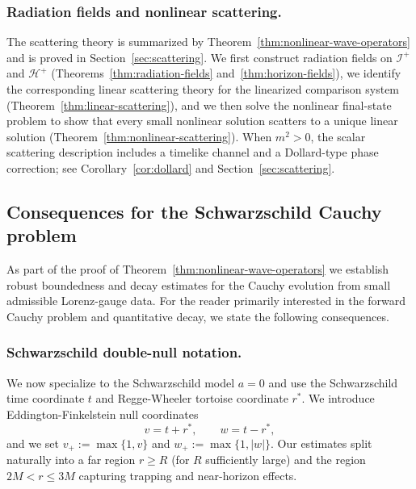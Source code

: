 \documentclass[11pt]{article}
\numberwithin{equation}{section}
\theoremstyle{plain}
\theoremstyle{definition}
\theoremstyle{remark}
\newcommand{\vplus}{v_{+}}
\newcommand{\wplus}{w_{+}}
\begin{document}
\subsubsection*{Radiation fields and nonlinear scattering.}
The scattering theory is summarized by Theorem~\ref{thm:nonlinear-wave-operators} and is proved in Section~\ref{sec:scattering}.
We first construct radiation fields on $\mathcal I^{+}$ and $\mathcal H^{+}$ (Theorems~\ref{thm:radiation-fields} and~\ref{thm:horizon-fields}), we identify the corresponding linear scattering theory for the linearized comparison system (Theorem~\ref{thm:linear-scattering}), and we then solve the nonlinear final-state problem to show that every small nonlinear solution scatters to a unique linear solution (Theorem~\ref{thm:nonlinear-scattering}).
When $m^{2}>0$, the scalar scattering description includes a timelike channel and a Dollard-type phase correction; see Corollary~\ref{cor:dollard} and Section~\ref{sec:scattering}.


\subsection{Consequences for the Schwarzschild Cauchy problem}\label{subsec:schwarzschild-cauchy-consequences}
As part of the proof of Theorem~\ref{thm:nonlinear-wave-operators} we establish robust boundedness and decay estimates for the Cauchy evolution from small admissible Lorenz-gauge data.
For the reader primarily interested in the forward Cauchy problem and quantitative decay, we state the following consequences.

\subsubsection*{Schwarzschild double-null notation.}
We now specialize to the Schwarzschild model $a=0$ and use the Schwarzschild time coordinate $t$ and Regge-Wheeler tortoise coordinate $r^\ast$.
We introduce Eddington-Finkelstein null coordinates
\begin{equation}
v=t+r^\ast,\qquad w=t-r^\ast,
\end{equation}
and we set $\vplus:=\max\{1,v\}$ and $\wplus:=\max\{1,|w|\}$.
Our estimates split naturally into a far region $r\ge R$ (for $R$ sufficiently large) and the region $2M<r\le 3M$ capturing trapping and near-horizon effects.
\end{document}
